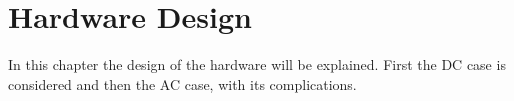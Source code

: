 
\chapter{Hardware Design}
\label{chp:hardware-design}

In this chapter the design of the hardware will be explained.
First the DC case is considered and then the AC case, with its complications.



